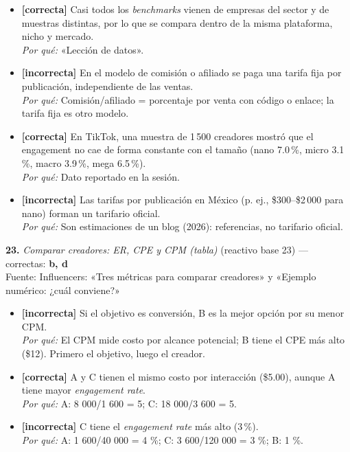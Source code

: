 \documentclass[10pt,letterpaper]{article}
\begin{document}
{\begin{itemize}[leftmargin=1.2em,itemsep=0pt,topsep=1pt,parsep=0pt]
\item[\textbf{a)}] {\footnotesize \textbf{[correcta]} Casi todos los \textit{benchmarks} vienen de empresas del sector y de muestras distintas, por lo que se compara dentro de la misma plataforma, nicho y mercado.\\ \textit{Por qué:} «Lección de datos».}
\item[\textbf{b)}] {\footnotesize \textbf{[incorrecta]} En el modelo de comisión o afiliado se paga una tarifa fija por publicación, independiente de las ventas.\\ \textit{Por qué:} Comisión/afiliado = porcentaje por venta con código o enlace; la tarifa fija es otro modelo.}
\item[\textbf{c)}] {\footnotesize \textbf{[correcta]} En TikTok, una muestra de 1\,500 creadores mostró que el engagement no cae de forma constante con el tamaño (nano 7.0\,\%, micro 3.1\,\%, macro 3.9\,\%, mega 6.5\,\%).\\ \textit{Por qué:} Dato reportado en la sesión.}
\item[\textbf{d)}] {\footnotesize \textbf{[incorrecta]} Las tarifas por publicación en México (p. ej., \$300--\$2\,000 para nano) forman un tarifario oficial.\\ \textit{Por qué:} Son estimaciones de un blog (2026): referencias, no tarifario oficial.}
\end{itemize}
\vspace{3pt}\noindent\textbf{23.} \textit{Comparar creadores: ER, CPE y CPM (tabla)} (reactivo base 23) — correctas: \textbf{b, d}\\[-1pt]
{\scriptsize Fuente: Influencers: «Tres métricas para comparar creadores» y «Ejemplo numérico: ¿cuál conviene?»}
\begin{itemize}[leftmargin=1.2em,itemsep=0pt,topsep=1pt,parsep=0pt]
\item[\textbf{a)}] {\footnotesize \textbf{[incorrecta]} Si el objetivo es conversión, B es la mejor opción por su menor CPM.\\ \textit{Por qué:} El CPM mide costo por alcance potencial; B tiene el CPE más alto (\$12). Primero el objetivo, luego el creador.}
\item[\textbf{b)}] {\footnotesize \textbf{[correcta]} A y C tienen el mismo costo por interacción (\$5.00), aunque A tiene mayor \textit{engagement rate}.\\ \textit{Por qué:} A: 8 000/1 600 = 5; C: 18 000/3 600 = 5.}
\item[\textbf{c)}] {\footnotesize \textbf{[incorrecta]} C tiene el \textit{engagement rate} más alto (3\,\%).\\ \textit{Por qué:} A: 1 600/40 000 = 4 \%; C: 3 600/120 000 = 3 \%; B: 1 \%.}

\end{itemize}}
\end{document}
